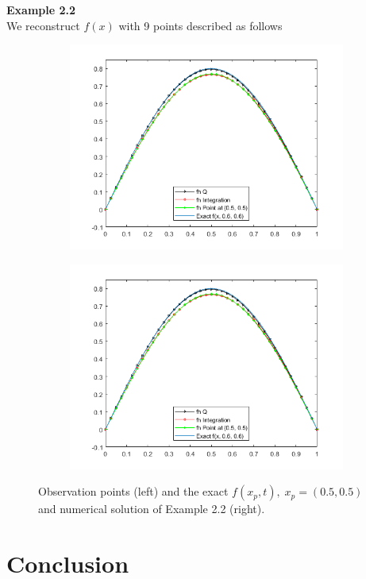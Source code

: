 \documentclass[]{article}
\begin{document}
\newpage
\noindent\textbf{Example 2.2}
\\
We reconstruct $f(x)$ with 9 points described as follows
\begin{figure}[h!]
	\begin{subfigure}{.5\linewidth}
		\centering
		\includegraphics[width=\linewidth]{../FreeFem++/fhx}
	\end{subfigure}%
	\begin{subfigure}{.5\linewidth}
		\centering
		\includegraphics[width=\linewidth]{../FreeFem++/fhx}
	\end{subfigure}
	\caption{Observation points (left) and the exact $f(x_p, t),\;x_p=(0.5, 0.5)$ and numerical solution of Example 2.2 (right).}
\end{figure}\justifying
\section{Conclusion}

\newpage
{}

\end{document}
